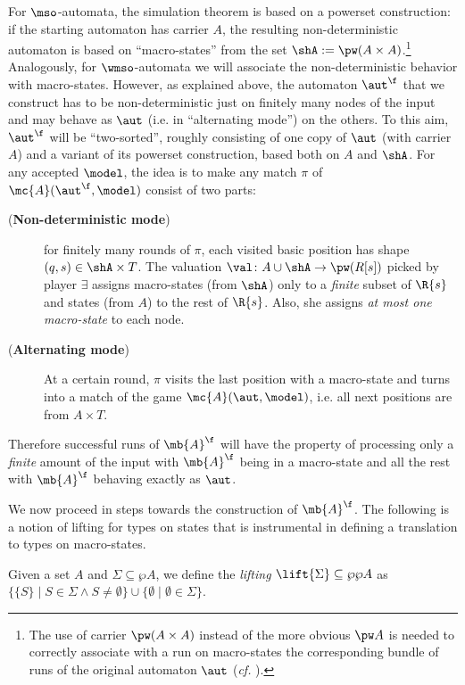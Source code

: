 For $\mso$-automata, the simulation theorem is based on a powerset construction: if the starting automaton has carrier $A$, the resulting non-deterministic automaton is based on ``macro-states'' from the set $\shA := \pw (A \times A)$.\footnote{The use of carrier $\pw (A \times A)$ instead of the more obvious $\pw A$ is needed to correctly associate with a run on macro-states the corresponding bundle of runs of the original automaton $\aut$ (\emph{cf.} \cite{Walukiewicz96}).} Analogously, for $\wmso$-automata we will associate the non-deterministic behavior with macro-states. However, as explained above, the automaton $\aut^{\f}$ that we construct has to be non-deterministic just on finitely many nodes of the input and may behave as $\aut$ (i.e. in ``alternating mode'') on the others. To this aim, $\aut^{\f}$ will be ``two-sorted'', roughly consisting of one copy of $\aut$ (with carrier $A$) and a variant of its powerset construction, based both on $A$ and $\shA$. For any accepted $\model$, the idea is to make any match $\pi$ of $\mc{A}(\aut^{\f},\model)$ consist of two parts:
\begin{description}
  \item[(\textbf{Non-deterministic mode})] for finitely many rounds of $\pi$, each visited basic position has shape $(q,s) \in \shA \times T$. The valuation $\val \colon A \cup \shA \to \pw (R[s])$ picked by player $\exists$ assigns macro-states (from $\shA$) only to a \emph{finite} subset of $\R{s}$ and states (from $A$) to the rest of $\R{s}$. Also, she assigns \emph{at most one macro-state} to each node.
  \item[(\textbf{Alternating mode})] At a certain round, $\pi$ visits the last position with a macro-state and turns into a match of the game $\mc{A}(\aut,\model)$, i.e. all next positions are from $A \times T$. %
\end{description}
Therefore successful runs of $\mb{A}^{\f}$ will have the property of processing only a \emph{finite} amount of the input with $\mb{A}^{\f}$ being in a macro-state and all the rest with $\mb{A}^{\f}$ behaving exactly as $\aut$. %

We now proceed in steps towards the construction of $\mb{A}^{\f}$. The following is a notion of lifting for types on states that is instrumental in defining a translation to types on macro-states. %
\begin{definition}
Given a set $A$ and $\Sigma \subseteq \wp A$, we define the \emph{lifting} $\lift{\Sigma} \subseteq \wp \wp A$ as $\{\{S\} \mid S \in \Sigma \wedge S \neq \emptyset\} \cup
    \{\emptyset \mid \emptyset \in \Sigma \}$.
\end{definition}

